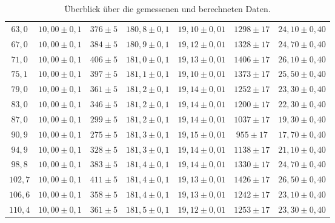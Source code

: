 \begin{table}
\begin{tabular}{ccccccc}
$63,0$ & $10,00 \pm 0,1$ & $376 \pm 5$ & $180,8 \pm 0,1$ & $19,10 \pm 0,01$ & $1298 \pm 17$  & $24,10 \pm 0,40$ \\

$67,0$ & $10,00 \pm 0,1$ & $384 \pm 5$ & $180,9 \pm 0,1$ & $19,12 \pm 0,01$ & $1328 \pm 17$  & $24,70 \pm 0,40$ \\

$71,0$ & $10,00 \pm 0,1$ & $406 \pm 5$ & $181,0 \pm 0,1$ & $19,13 \pm 0,01$ & $1406 \pm 17$  & $26,10 \pm 0,40$ \\

$75,1$ & $10,00 \pm 0,1$ & $397 \pm 5$ & $181,1 \pm 0,1$ & $19,10 \pm 0,01$ & $1373 \pm 17$  & $25,50 \pm 0,40$ \\

$79,0$ & $10,00 \pm 0,1$ & $361 \pm 5$ & $181,2 \pm 0,1$ & $19,14 \pm 0,01$ & $1252 \pm 17$  & $23,30 \pm 0,40$ \\

$83,0$ & $10,00 \pm 0,1$ & $346 \pm 5$ & $181,2 \pm 0,1$ & $19,14 \pm 0,01$ & $1200 \pm 17$  & $22,30 \pm 0,40$ \\

$87,0$ & $10,00 \pm 0,1$ & $299 \pm 5$ & $181,2 \pm 0,1$ & $19,14 \pm 0,01$ & $1037 \pm 17$  & $19,30 \pm 0,40$ \\

$90,9$ & $10,00 \pm 0,1$ & $275 \pm 5$ & $181,3 \pm 0,1$ & $19,15 \pm 0,01$ & $ 955 \pm 17$  & $17,70 \pm 0,40$ \\

$94,9$ & $10,00 \pm 0,1$ & $328 \pm 5$ & $181,3 \pm 0,1$ & $19,14 \pm 0,01$ & $1138 \pm 17$  & $21,10 \pm 0,40$ \\

$98,8$ & $10,00 \pm 0,1$ & $383 \pm 5$ & $181,4 \pm 0,1$ & $19,14 \pm 0,01$ & $1330 \pm 17$  & $24,70 \pm 0,40$ \\

$102,7$ & $10,00 \pm 0,1$ & $411 \pm 5$ & $181,4 \pm 0,1$ & $19,13 \pm 0,01$ & $1426 \pm 17$ & $26,50 \pm 0,40$ \\

$106,6$ & $10,00 \pm 0,1$ & $358 \pm 5$ & $181,4 \pm 0,1$ & $19,13 \pm 0,01$ & $1242 \pm 17$ & $23,10 \pm 0,40$ \\

$110,4$ & $10,00 \pm 0,1$ & $361 \pm 5$ & $181,5 \pm 0,1$ & $19,12 \pm 0,01$ & $1253 \pm 17$ & $23,30 \pm 0,40$ \\

\bottomrule
\end{tabular}

\caption{Überblick über die gemessenen und berechneten Daten.}
\label{tab:1}
\end{table}

